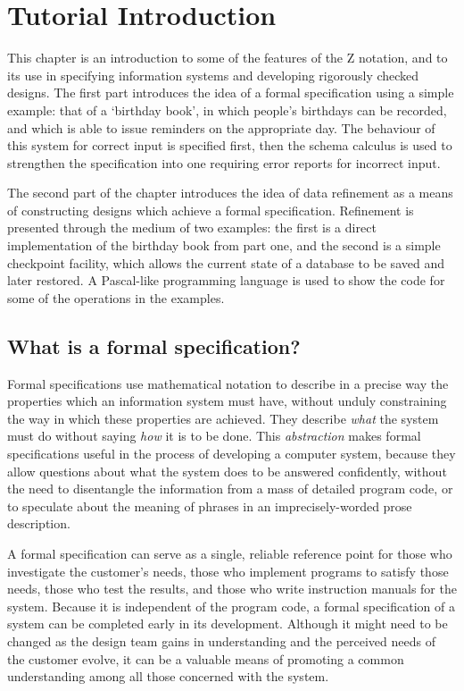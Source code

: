 \chapter{Tutorial Introduction}\label{c:tutorial}

This chapter is an introduction to some of the features of the Z
notation, and to its use in specifying information systems and
developing rigorously checked designs.
The first part introduces the idea of a formal specification using
a simple example: that of a `birthday book', in which people's
birthdays can be recorded, and which is able to issue reminders
on the appropriate day.
The behaviour of this system for correct input is
specified first, then the schema calculus is used to
strengthen the specification into one requiring error
reports for incorrect input.

The second part of the chapter introduces the idea of data refinement as
a means of constructing designs which achieve a formal
specification. Refinement is presented through the medium of two
examples: the first is a direct implementation of the birthday
book from part one, and the second is a simple checkpoint facility,
which allows the current state of a database to be saved and later
restored. A Pascal-like programming language is used to show
the code for some of the operations in the examples.

\section{What is a formal specification?}

Formal specifications use mathematical notation to describe in a
precise way the properties which an information system must have,
without unduly constraining the way in which these properties are
achieved. They describe {\em what\/} the system must do without saying
{\em how\/} it is to be done.  This {\em abstraction\/} makes formal
specifications useful in the process of developing a computer system,
because they allow questions about what the system does to be answered
confidently, without the need to disentangle the information from a
mass of detailed program code, or to speculate about the meaning of
phrases in an imprecisely-worded prose description.

A formal specification can serve as a single, reliable reference point
for those who investigate the customer's needs, those who implement programs
to satisfy those needs, those who test the results, and those who write
instruction manuals for the system.
Because it is independent of the program code, a formal specification of
a system can be completed early in its development. Although it
might need to be changed as the design team gains in understanding and
the perceived needs of the customer evolve, it can be a valuable means
of promoting a common understanding among all those concerned with the
system.

